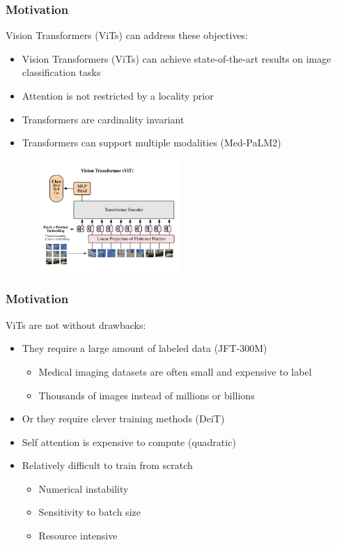 \documentclass{beamer}
\begin{document}
\begin{frame}
   \frametitle{Motivation}
   Vision Transformers (ViTs) can address these objectives:
   \begin{itemize}
        \item Vision Transformers (ViTs) can achieve state-of-the-art results on image classification tasks \cite{dosovitskiy2021image}
        \item Attention is not restricted by a locality prior
        \item Transformers are cardinality invariant
        \item Transformers can support multiple modalities (Med-PaLM2) \cite{singhal2023expertlevel}
   \end{itemize}
   \begin{figure}
       \centering
       \includegraphics[width=0.5\textwidth]{vit_diagram.png}
   \end{figure}
\end{frame}

\begin{frame}
   \frametitle{Motivation}
   ViTs are not without drawbacks:
   \begin{itemize}
        \item They require a large amount of labeled data (JFT-300M) \cite{dosovitskiy2021image}
        \begin{itemize}
            \item Medical imaging datasets are often small and expensive to label
            \item Thousands of images instead of millions or billions
        \end{itemize}
        \item Or they require clever training methods (DeiT) \cite{pmlr-v139-touvron21a}
        \item Self attention is expensive to compute (quadratic)
        \item Relatively difficult to train from scratch
        \begin{itemize}
            \item Numerical instability
            \item Sensitivity to batch size
            \item Resource intensive
        \end{itemize}
   \end{itemize}
\end{frame}
\end{document}
